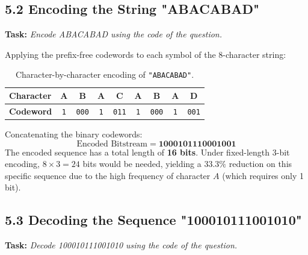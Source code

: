 \documentclass[11pt,a4paper]{article}
\begin{document}
\subsection{5.2 Encoding the String "ABACABAD"}
\textbf{Task:} \textit{Encode ABACABAD using the code of the question.}

Applying the prefix-free codewords to each symbol of the 8-character string:
\begin{table}[H]
\centering
\caption{Character-by-character encoding of \texttt{"ABACABAD"}.}
\begin{tabular}{lcccccccc}
\toprule
\textbf{Character} & A & B & A & C & A & B & A & D \\
\midrule
\textbf{Codeword} & \texttt{1} & \texttt{000} & \texttt{1} & \texttt{011} & \texttt{1} & \texttt{000} & \texttt{1} & \texttt{001} \\
\bottomrule
\end{tabular}
\end{table}

Concatenating the binary codewords:
\begin{equation}
    \text{Encoded Bitstream} = \mathbf{1000101110001001}
\end{equation}
The encoded sequence has a total length of \textbf{16 bits}. Under fixed-length 3-bit encoding, $8 \times 3 = 24$ bits would be needed, yielding a $33.3\%$ reduction on this specific sequence due to the high frequency of character $A$ (which requires only 1 bit).

\subsection{5.3 Decoding the Sequence "100010111001010"}
\textbf{Task:} \textit{Decode 100010111001010 using the code of the question.}
\end{document}
